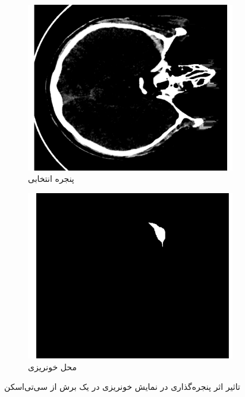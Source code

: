 \begin{figure}[h!]
\begin{subfigure}{0.33\textwidth}
    \end{subfigure}\hfil %
    \begin{subfigure}{0.33\textwidth}
      \includegraphics[width=\linewidth]{Images/chapter2/selected_window_no_caption.png}
      \caption{پنجره انتخابی}
      \label{fig:ch2-selected-window}
    \end{subfigure}\hfil %
    \begin{subfigure}{0.33\textwidth}
      \includegraphics[width=\linewidth]{Images/chapter2/bleed_location_no_caption.png}
      \caption{محل خونریزی}
      \label{fig:ch2-bleed-location}
    \end{subfigure}
\caption{تاثیر اثر پنجره‌گذاری در نمایش خونریزی در یک برش از سی‌تی‌اسکن}
\label{fig:ch2-windowed-ct-sample}
\end{figure}

